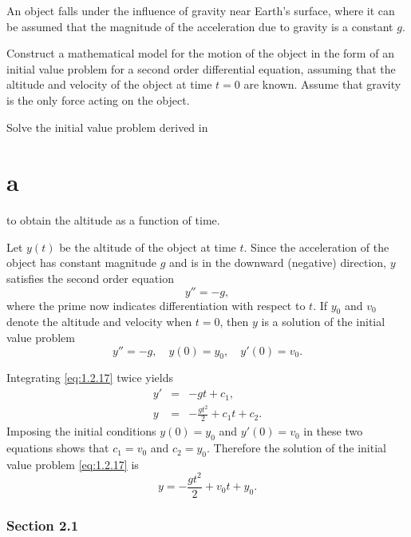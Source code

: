 \setcounter{example}{7}
\begin{example}
  \label{example:1.2.8} \rm An object falls under the influence of gravity near Earth's surface,
  where it can be assumed that the magnitude of the acceleration due to gravity is a constant $g$.
  \begin{alist}
    \item %
    Construct a mathematical model for the motion of the object in the form of an initial value
    problem for a second order differential equation, assuming that the altitude and velocity of the
    object at time $t=0$ are known. Assume that gravity is the only force acting on the object.

    \item %
    Solve the initial value problem derived in \part{a} to obtain the altitude as a function of
    time.
  \end{alist}
\end{example}
\setcounter{equation}{16}
\begin{examplesolution}
 Let $y(t)$ be the altitude of the object at time $t$. Since the acceleration of the
object has constant magnitude $g$ and is in the downward (negative) direction, $y$ satisfies the
second order equation
\[
  y''=-g,
\]
where the prime now indicates differentiation with respect to $t$. If $y_{0}$ and $v_{0}$ denote the
altitude and velocity when $t=0$, then $y$ is a solution of the initial value problem
\begin{equation}
  \label{eq:1.2.17}y''=-g,\quad y(0)=y_{0},\quad y'(0)=v_{0}.
\end{equation}

 Integrating \eqref{eq:1.2.17} twice yields
\begin{eqnarray*}
  y' & = & -gt+c_{1}, \\
  y  & = & -\frac{gt^{2}}{2}+c_{1}t+c_{2}.
\end{eqnarray*}
Imposing the initial conditions $y(0)=y_{0}$ and $y'(0)=v_{0}$ in these two equations shows that
$c_{1}=v_{0}$ and $c_{2}=y_{0}$. Therefore the solution of the initial value problem
\eqref{eq:1.2.17} is
\[
  y=-\frac{gt^{2}}{2}+v_{0}t+y_{0}.
\]
\end{examplesolution}

\section*{Section 2.1}
{}
\setcounter{chapter}{2}
\setcounter{section}{1}

